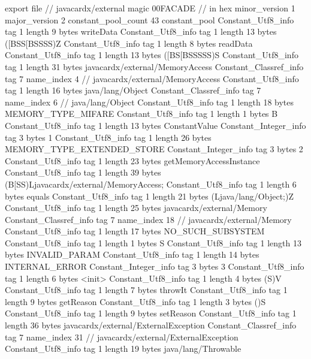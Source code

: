 export file {		// javacardx/external
	magic	00FACADE		 // in hex
	minor_version	1
	major_version	2
	constant_pool_count	43
	constant_pool {
		Constant_Utf8_info {
			tag	1
			length	9
			bytes	writeData
		}
		Constant_Utf8_info {
			tag	1
			length	13
			bytes	([BSS[BSSSS)Z
		}
		Constant_Utf8_info {
			tag	1
			length	8
			bytes	readData
		}
		Constant_Utf8_info {
			tag	1
			length	13
			bytes	([BS[BSSSSS)S
		}
		Constant_Utf8_info {
			tag	1
			length	31
			bytes	javacardx/external/MemoryAccess
		}
		Constant_Classref_info {
			tag	7
			name_index	4		// javacardx/external/MemoryAccess
		}
		Constant_Utf8_info {
			tag	1
			length	16
			bytes	java/lang/Object
		}
		Constant_Classref_info {
			tag	7
			name_index	6		// java/lang/Object
		}
		Constant_Utf8_info {
			tag	1
			length	18
			bytes	MEMORY_TYPE_MIFARE
		}
		Constant_Utf8_info {
			tag	1
			length	1
			bytes	B
		}
		Constant_Utf8_info {
			tag	1
			length	13
			bytes	ConstantValue
		}
		Constant_Integer_info {
			tag	3
			bytes	1
		}
		Constant_Utf8_info {
			tag	1
			length	26
			bytes	MEMORY_TYPE_EXTENDED_STORE
		}
		Constant_Integer_info {
			tag	3
			bytes	2
		}
		Constant_Utf8_info {
			tag	1
			length	23
			bytes	getMemoryAccessInstance
		}
		Constant_Utf8_info {
			tag	1
			length	39
			bytes	(B[SS)Ljavacardx/external/MemoryAccess;
		}
		Constant_Utf8_info {
			tag	1
			length	6
			bytes	equals
		}
		Constant_Utf8_info {
			tag	1
			length	21
			bytes	(Ljava/lang/Object;)Z
		}
		Constant_Utf8_info {
			tag	1
			length	25
			bytes	javacardx/external/Memory
		}
		Constant_Classref_info {
			tag	7
			name_index	18		// javacardx/external/Memory
		}
		Constant_Utf8_info {
			tag	1
			length	17
			bytes	NO_SUCH_SUBSYSTEM
		}
		Constant_Utf8_info {
			tag	1
			length	1
			bytes	S
		}
		Constant_Utf8_info {
			tag	1
			length	13
			bytes	INVALID_PARAM
		}
		Constant_Utf8_info {
			tag	1
			length	14
			bytes	INTERNAL_ERROR
		}
		Constant_Integer_info {
			tag	3
			bytes	3
		}
		Constant_Utf8_info {
			tag	1
			length	6
			bytes	<init>
		}
		Constant_Utf8_info {
			tag	1
			length	4
			bytes	(S)V
		}
		Constant_Utf8_info {
			tag	1
			length	7
			bytes	throwIt
		}
		Constant_Utf8_info {
			tag	1
			length	9
			bytes	getReason
		}
		Constant_Utf8_info {
			tag	1
			length	3
			bytes	()S
		}
		Constant_Utf8_info {
			tag	1
			length	9
			bytes	setReason
		}
		Constant_Utf8_info {
			tag	1
			length	36
			bytes	javacardx/external/ExternalException
		}
		Constant_Classref_info {
			tag	7
			name_index	31		// javacardx/external/ExternalException
		}
		Constant_Utf8_info {
			tag	1
			length	19
			bytes	java/lang/Throwable
}}}
